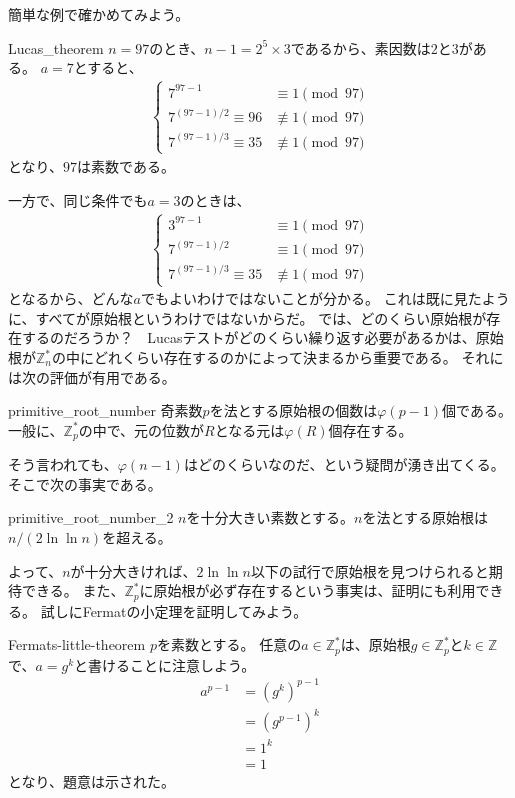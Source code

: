 簡単な例で確かめてみよう。

\begin{Exam}{}{Lucas_theorem}
$n=97$のとき、$n-1=2^5\times3$であるから、素因数は$2$と$3$がある。
$a=7$とすると、
\begin{align*}
\begin{cases}
7^{97-1} &\equiv 1 \pmod{97}\\
7^{(97-1)/2}  \equiv 96 &\not\equiv 1 \pmod{97}\\
7^{(97-1)/3}  \equiv 35 &\not\equiv 1 \pmod{97}
\end{cases}
\end{align*}
となり、$97$は素数である。
\end{Exam}

一方で、同じ条件でも$a=3$のときは、
\begin{align*}
\begin{cases}
3^{97-1} &\equiv 1 \pmod{97}\\
7^{(97-1)/2}  &\equiv 1 \pmod{97}\\
7^{(97-1)/3}  \equiv 35 &\not\equiv 1 \pmod{97}
\end{cases}
\end{align*}
となるから、どんな$a$でもよいわけではないことが分かる。
これは既に見たように、すべてが原始根というわけではないからだ。
では、どのくらい原始根が存在するのだろうか？　Lucasテストがどのくらい繰り返す必要があるかは、原始根が$\mathbb{Z}_n^*$の中にどれくらい存在するのかによって決まるから重要である。
それには次の評価が有用である。

\begin{Prop}{}{primitive_root_number}
奇素数$p$を法とする原始根の個数は$\varphi(p-1)$個である。
一般に、$\mathbb{Z}_p^*$の中で、元の位数が$R$となる元は$\varphi(R)$個存在する。
\end{Prop}

そう言われても、$\varphi(n-1)$はどのくらいなのだ、という疑問が湧き出てくる。
そこで次の事実である。

\begin{Prop}{}{primitive_root_number_2}
$n$を十分大きい素数とする。$n$を法とする原始根は$n/(2\ln\ln{n})$を超える。
\end{Prop}

よって、$n$が十分大きければ、$2\ln\ln{n}$以下の試行で原始根を見つけられると期待できる。
また、$\mathbb{Z}_p^*$に原始根が必ず存在するという事実は、証明にも利用できる。
試しにFermatの小定理を証明してみよう。

\begin{thProof}{Fermats-little-theorem}
$p$を素数とする。
任意の$a\in\mathbb{Z}_p^*$は、原始根$g\in\mathbb{Z}_p^*$と$k\in\mathbb{Z}$で、$a=g^k$と書けることに注意しよう。
\begin{align*}
a^{p-1} &= (g^k)^{p-1}\\
 &= (g^{p-1})^k\\
 &= 1^k \\
 &= 1
\end{align*}
となり、題意は示された。
\end{thProof}

